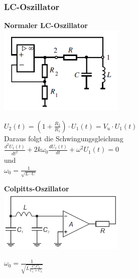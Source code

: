 	\subsubsection{LC-Oszillator}
		\begin{multicols}{2}
			\textbf{Normaler LC-Oszillator} \\
			\includegraphics[width=6cm]{./bilder/lcOszillator}
			
		\columnbreak
			$U_2(t) = (1+\frac{R_2}{R_1}) \cdot U_1(t) = V_u \cdot U_1(t)$ \\
			
			Daraus folgt die Schwingungsgleichung \\
			$\frac{d^2 U_1(t)}{dt^2}+2k\omega_0 \frac{dU_1(t)}{dt}+\omega^2U_1(t)=0$ \\
			
			und \\
			$\omega_0 = \frac{1}{\sqrt{L\cdot C}}$
		\end{multicols}
		
		\begin{multicols}{2}
			\textbf{Colpitts-Oszillator}\\
			\includegraphics[width=6cm]{./bilder/osziLC.png}\\
			
		\columnbreak
		
			$\omega_0=\frac{1}{\sqrt{L\frac{C_1 C_2}{C_1+C_2}}}$\\
			
		\end{multicols}

